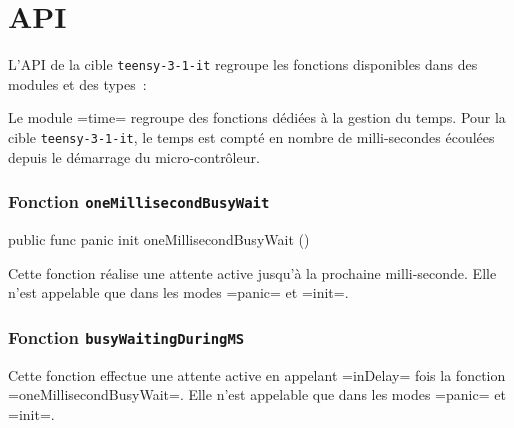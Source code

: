 \section{API}

L'API de la cible \texttt{teensy-3-1-it} regroupe les fonctions disponibles dans des modules et des types~:


Le module \plm=time= regroupe des fonctions dédiées à la gestion du temps. Pour la cible \texttt{teensy-3-1-it}, le temps est compté en nombre de milli-secondes écoulées depuis le démarrage du micro-contrôleur. 

\subsubsection{Fonction \texttt{oneMillisecondBusyWait}}


\begin{PLM}
  public func panic init oneMillisecondBusyWait ()
\end{PLM}

Cette fonction réalise une attente active jusqu'à la prochaine milli-seconde. Elle n'est appelable que dans les modes \plm=panic= et \plm=init=. 





\subsubsection{Fonction \texttt{busyWaitingDuringMS}}


Cette fonction effectue une attente active en appelant \plm=inDelay= fois la fonction \plm=oneMillisecondBusyWait=. Elle n'est appelable que dans les modes \plm=panic= et \plm=init=. 





